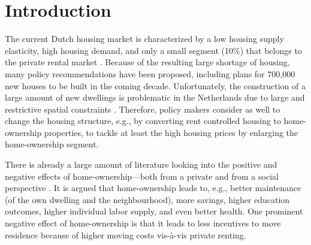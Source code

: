 \documentclass[fleqn,10pt]{SelfArx} %
\affiliation{\textsuperscript{1}\textit{Department of Spatial Economics, Vrije Universiteit Amsterdam, Amsterdam, The Netherlands}} %
\affiliation{*\textbf{Corresponding author}: \Letter{} t.de.graaff@vu.n; \Mundus{} \href{thomasdegraaff.nl}{thomasdegraaff.nl}} %
\begin{document}
	
	\flushbottom %
	\maketitle %
	\thispagestyle{empty} %
	
	
	\section{Introduction} %

        The current Dutch housing market is characterized by a low
        housing supply elasticity, high housing demand, and only a
        small segment (10\%) that belongs to the private rental market
        \citep{michielsen2017}. Because of the resulting large
        shortage of housing, many policy recommendations have been
        proposed, including plans for 700,000 new houses to be built
        in the coming decade. Unfortunately, the construction of a
        large amount of new dwellings is problematic in the
        Netherlands due to large and restrictive spatial constraints
        \citep{michielsen2019}. Therefore, policy makers consider 
        as well to change the housing structure, e.g., by converting
        rent controlled housing to home-ownership properties, to
        tackle at least the high housing prices by enlarging the
        home-ownership segment.
        
        There is already a large amount of literature looking into the positive
        and negative effects of home-ownership---both from a private and from a social perspective \citep[see for an
        overview][]{dietz2003social}. It is argued that home-ownership leads to,
        e.g., better maintenance (of the own dwelling and the neighbourhood),
        more savings, higher education outcomes, higher individual labor supply,
        and even better health. One prominent negative effect of home-ownership
        is that it leads to less incentives to move residence because of higher
        moving costs vis-\`{a}-vis private renting.  
        
\end{document}
